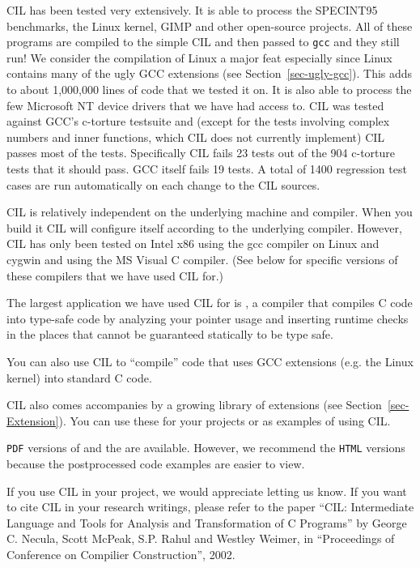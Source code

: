 \documentclass[letterpaper]{article}
\def\secref#1{Section~\ref{sec-#1}}
\def\t#1{{\tt #1}}
\newcommand\ahreftop[2]{{\ahref{javascript:loadTop('#1')}{#2}}}
\begin{document}
 CIL has been tested very extensively. It is able to process the SPECINT95
benchmarks, the Linux kernel, GIMP and other open-source projects. All of
these programs are compiled to the simple CIL and then passed to \t{gcc} and
they still run! We consider the compilation of Linux a major feat especially
since Linux contains many of the ugly GCC extensions (see \secref{ugly-gcc}).
This adds to about 1,000,000 lines of code that we tested it on. It is also
able to process the few Microsoft NT device drivers that we have had access
to. CIL was tested against GCC's c-torture testsuite and (except for the tests
involving complex numbers and inner functions, which CIL does not currently
implement) CIL passes most of the tests. Specifically CIL fails 23 tests out
of the 904 c-torture tests that it should pass. GCC itself fails 19 tests. A
total of 1400 regression test cases are run automatically on each change to
the CIL sources.

 CIL is relatively independent on the underlying machine and compiler. When
you build it CIL will configure itself according to the underlying compiler.
However, CIL has only been tested on Intel x86 using the gcc compiler on Linux
and cygwin and using the MS Visual C compiler. (See below for specific
versions of these compilers that we have used CIL for.)

 The largest application we have used CIL for is
\ahreftop{../ccured/index.html}{CCured}, a compiler that compiles C code into
type-safe code by analyzing your pointer usage and inserting runtime checks in
the places that cannot be guaranteed statically to be type safe.  

 You can also use CIL to ``compile'' code that uses GCC extensions (e.g. the
Linux kernel) into standard C code.

 CIL also comes accompanies by a growing library of extensions (see
\secref{Extension}). You can use these for your projects or as examples of
using CIL. 

\t{PDF} versions of  and the
 are available. However, we recommend the
\t{HTML} versions because the postprocessed code examples are easier to
view. 

 If you use CIL in your project, we would appreciate letting us know. If you
want to cite CIL in your research writings, please refer to the paper ``CIL:
Intermediate Language and Tools for Analysis and Transformation of C
Programs'' by George C. Necula, Scott McPeak, S.P. Rahul and Westley Weimer,
in ``Proceedings of Conference on Compilier Construction'', 2002.
\end{document}
